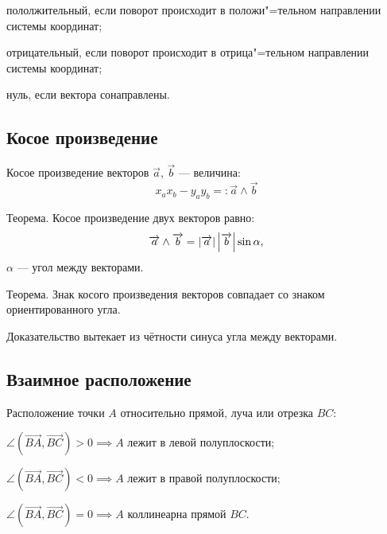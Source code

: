 \begin{list*}
\item{\bold пололжительный}, если поворот происходит в {\ital положи"=тельном} направлении системы координат;
\item{\bold отрицательный}, если поворот происходит в {\ital отрица"=тельном} направлении системы координат;
\item{\bold нуль}, если вектора {\ital сонаправлены}.
\end{list*}

\subsection{Косое произведение}

{\bold Косое произведение} {\ital векторов} $\overrightarrow{a}$, $\overrightarrow{b}$ --- величина:
$$x_ax_b-y_ay_b=:\overrightarrow{a}\land\overrightarrow{b}$$
\begin{theorem}
{\bold Теорема.} Косое произведение двух векторов равно:
$$\overrightarrow{a}\land\overrightarrow{b}=\left|\overrightarrow{a}\right|\left|\overrightarrow{b}\right|\sin\alpha,$$
$\alpha$ --- угол между векторами.
\end{theorem}

\begin{theorem}
{\bold Теорема.} Знак косого произведения векторов {\ital совпадает} со знаком ориентированного угла.
\end{theorem}

Доказательство вытекает из {\ital чётности} синуса угла между векторами.

\subsection{Взаимное расположение}

Расположение {\ital точки} $A$ относительно {\ital прямой, луча или отрезка} $BC$:

\begin{list*}
\item$\angle(\overrightarrow{BA},\overrightarrow{BC})\greater 0\implies A$ лежит в {\bold левой} полуплоскости;
\item$\angle(\overrightarrow{BA},\overrightarrow{BC})\less 0\implies A$ лежит в {\bold правой} полуплоскости;
\item$\angle(\overrightarrow{BA},\overrightarrow{BC})=0\implies A$ {\bold коллинеарна} прямой $BC$.
\end{list*}

